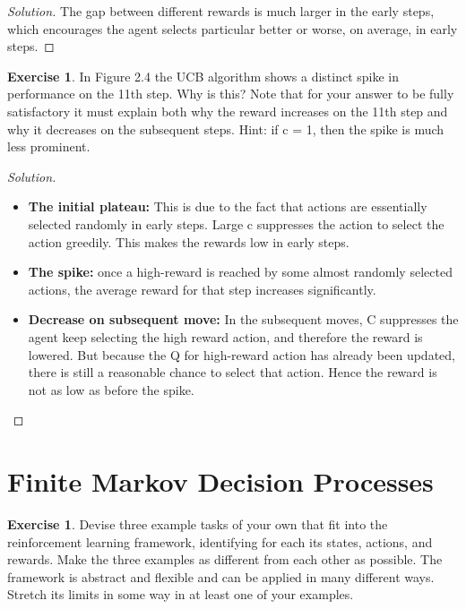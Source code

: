 \documentclass[oneside,11pt]{article}
\theoremstyle{definition}
\newtheorem{exer}[thm]{Exercise}
\newenvironment{solution}
{\renewcommand\qedsymbol{$\blacksquare$}\begin{proof}[Solution]} {\end{proof}}
\begin{document}
\begin{shaded}
\begin{solution} 
The gap between different rewards is much larger in the early steps, which encourages the agent selects particular better or worse, on average, in early steps.

\end{solution}
\end{shaded}


\begin{exer}
In Figure 2.4 the UCB algorithm shows a distinct spike in performance on the 11th step. Why is this? Note that for your answer to be fully satisfactory it must explain both why the reward increases on the 11th step and why it decreases on the subsequent steps. Hint: if c = 1, then the spike is much less prominent.
\end{exer}

\begin{shaded}
\begin{solution}
\begin{itemize}
\item \textbf{The initial plateau:} This is due to the fact that actions are essentially selected randomly in early steps. Large c suppresses the action to select the action greedily. This makes the rewards low in early steps.

\item \textbf{The spike:} once a high-reward is reached by some almost randomly selected actions, the average reward for that step increases significantly.

\item \textbf{Decrease on subsequent move:} In the subsequent moves, C suppresses the agent keep selecting the high reward action, and therefore the reward is lowered. But because the Q for high-reward action has already been updated, there is still a reasonable chance to select that action. Hence the reward is not as low as before the spike.
 \end{itemize}
\end{solution}
\end{shaded}





\section{Finite Markov Decision Processes}

\begin{exer}
Devise three example tasks of your own that fit into the reinforcement learning framework, identifying for each its states, actions, and rewards. Make the three examples as different from each other as possible. The framework is abstract and flexible and can be applied in many different ways. Stretch its limits in some way in at least one of your examples.
\end{exer}
\end{document}
